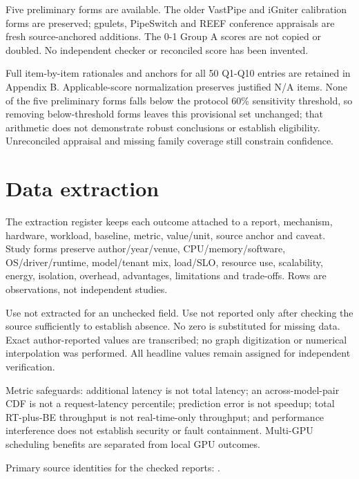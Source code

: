 \documentclass[12pt,a4paper]{article}
\begin{document}
Five preliminary forms are available. The older VastPipe and iGniter calibration forms are preserved; gpulets, PipeSwitch and REEF conference appraisals are fresh source-anchored additions. The 0-1 Group A scores are not copied or doubled. No independent checker or reconciled score has been invented.



Full item-by-item rationales and anchors for all 50 Q1-Q10 entries are retained in Appendix B. Applicable-score normalization preserves justified N/\allowbreak{}A items. None of the five preliminary forms falls below the protocol 60\% sensitivity threshold, so removing below-threshold forms leaves this provisional set unchanged; that arithmetic does not demonstrate robust conclusions or establish eligibility. Unreconciled appraisal and missing family coverage still constrain confidence.


\section{Data extraction}

The extraction register keeps each outcome attached to a report, mechanism, hardware, workload, baseline, metric, value/\allowbreak{}unit, source anchor and caveat. Study forms preserve author/\allowbreak{}year/\allowbreak{}venue, CPU/\allowbreak{}memory/\allowbreak{}software, OS/\allowbreak{}driver/\allowbreak{}runtime, model/\allowbreak{}tenant mix, load/\allowbreak{}SLO, resource use, scalability, energy, isolation, overhead, advantages, limitations and trade-offs. Rows are observations, not independent studies.


Use not extracted for an unchecked field. Use not reported only after checking the source sufficiently to establish absence. No zero is substituted for missing data. Exact author-reported values are transcribed; no graph digitization or numerical interpolation was performed. All headline values remain assigned for independent verification.


Metric safeguards: additional latency is not total latency; an across-model-pair CDF is not a request-latency percentile; prediction error is not speedup; total RT-plus-BE throughput is not real-time-only throughput; and performance interference does not establish security or fault containment. Multi-GPU scheduling benefits are separated from local GPU outcomes.


Primary source identities for the checked reports: \cite{vastpipe,igniter,gpulets,pipeswitch,reef}.
\end{document}
